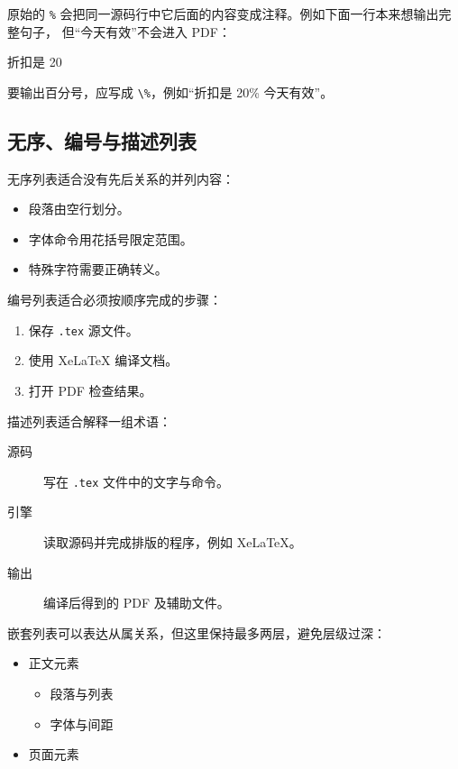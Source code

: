 \begin{errorbox}
原始的 \verb|%| 会把同一源码行中它后面的内容变成注释。例如下面一行本来想输出完整句子，
但“今天有效”不会进入 PDF：
\begin{codeblock}
折扣是 20%
\end{codeblock}
要输出百分号，应写成 \verb|\%|，例如“折扣是 20\% 今天有效”。
\end{errorbox}

\subsection{无序、编号与描述列表}

无序列表适合没有先后关系的并列内容：
\begin{itemize}
    \item 段落由空行划分。
    \item 字体命令用花括号限定范围。
    \item 特殊字符需要正确转义。
\end{itemize}

编号列表适合必须按顺序完成的步骤：
\begin{enumerate}
    \item 保存 \texttt{.tex} 源文件。
    \item 使用 XeLaTeX 编译文档。
    \item 打开 PDF 检查结果。
\end{enumerate}

描述列表适合解释一组术语：
\begin{description}
    \item[源码] 写在 \texttt{.tex} 文件中的文字与命令。
    \item[引擎] 读取源码并完成排版的程序，例如 XeLaTeX。
    \item[输出] 编译后得到的 PDF 及辅助文件。
\end{description}

嵌套列表可以表达从属关系，但这里保持最多两层，避免层级过深：
\begin{itemize}
    \item 正文元素
    \begin{itemize}
        \item 段落与列表
        \item 字体与间距
    \end{itemize}
    \item 页面元素
\end{itemize}

